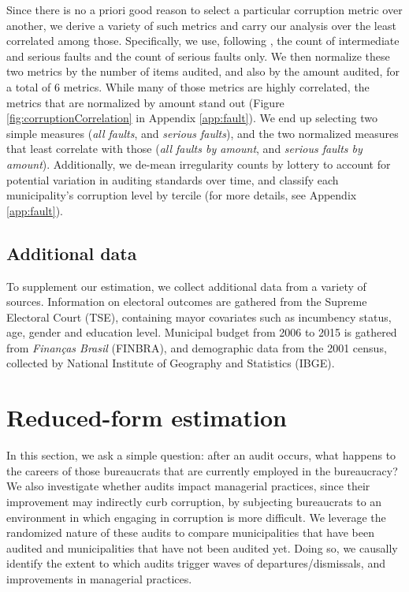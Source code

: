 \documentclass[12pt,a4paper]{article}
\theoremstyle{definition}
\begin{document}
Since there is no a priori good reason to select a particular corruption metric over another, we derive a variety of such metrics and carry our analysis over the least correlated among those. Specifically, we use, following \citet{avis_government_2018}, the count of intermediate and serious faults and the count of serious faults only. We then normalize these two metrics by the number of items audited, and also by the amount audited, for a total of 6 metrics. While many of those metrics are highly correlated, the metrics that are normalized by amount stand out (Figure \ref{fig:corruptionCorrelation} in Appendix \ref{app:fault}). We end up selecting two simple measures (\emph{all faults}, and \emph{serious faults}), and the two normalized measures that least correlate with those (\emph{all faults by amount}, and \emph{serious faults by amount}). Additionally, we de-mean irregularity counts by lottery to account for potential variation in auditing standards over time, and classify each municipality's corruption level by tercile (for more details, see Appendix \ref{app:fault}).

\subsection{Additional data}

To supplement our estimation, we collect additional data from a variety of sources. Information on electoral outcomes are gathered from the Supreme Electoral Court (TSE), containing mayor covariates such as incumbency status, age, gender and education level. 
Municipal budget from 2006 to 2015 is gathered from \textit{Finanças Brasil} (FINBRA), and demographic data from the 2001 census, collected by National Institute of Geography and Statistics (IBGE).

\section{Reduced-form estimation}
\label{sec:causal}

In this section, we ask a simple question: after an audit occurs, what happens to the careers of those bureaucrats that are currently employed in the bureaucracy? We also investigate whether audits impact managerial practices, since their improvement may indirectly curb corruption, by subjecting bureaucrats to an environment in which engaging in corruption is more difficult. We leverage the randomized nature of these audits to compare municipalities that have been audited and municipalities that have not been audited yet. Doing so, we causally identify the extent to which audits trigger waves of departures/dismissals, and improvements in managerial practices. 
\end{document}
